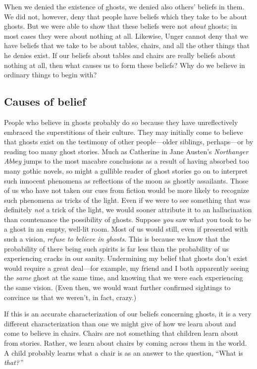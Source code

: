 \documentclass[11pt]{standalone} \newif\ifstandlone \standalonetrue
\begin{document}
\begin{spacing}{1.5}
When we denied the existence of ghosts, we denied also others' beliefs
in them.  We did not, however, deny that people have beliefs which
they take to be about ghosts.  But we were able to show that these
beliefs were not {\em about} ghosts; in most cases they were about
nothing at all.  Likewise, Unger cannot deny that we have beliefs that
we take to be about tables, chairs, and all the other things that he
denies exist.  If our beliefs about tables and chairs are really
beliefs about nothing at all, then what causes us to form these
beliefs?  Why do we believe in ordinary things to begin with?

\subsection{Causes of belief}
\label{unger-cause}
People who believe in ghosts probably do so because they have
unreflectively embraced the superstitions of their culture.  They may
initially come to believe that ghosts exist on the testimony of other
people---older siblings, perhaps---or by reading too many ghost
stories.  Much as Catherine in Jane Austen's {\em Northanger Abbey}
jumps to the most macabre conclusions as a result of having absorbed
too many gothic novels, so might a gullible reader of ghost stories go
on to interpret such innocent phenomena as reflections of the moon as
ghostly assailants.  Those of us who have not taken our cues from
fiction would be more likely to recognize such phenomena as tricks of
the light.  Even if we were to see something that was definitely {\em
  not} a trick of the light, we would sooner attribute it to an
hallucination than countenance the possibility of ghosts.  Suppose
{\em you} saw what you took to be a ghost in an empty, well-lit room.
Most of us would still, even if presented with such a vision, {\em
  refuse to believe in ghosts}.  This is because we know that the
probability of there being such spirits is far less than the
probability of us experiencing cracks in our sanity.  Undermining my
belief that ghosts don't exist would require a great deal---for
example, my friend and I both apparently seeing the {\em same} ghost
at the same time, and knowing that we were each experiencing the same
vision.  (Even then, we would want further confirmed sightings to
convince us that we weren't, in fact, crazy.)

If this is an accurate characterization of our beliefs concerning
ghosts, it is a very different characterization than one we might give
of how we learn about and come to believe in chairs.  Chairs are not
something that children learn about from stories.  Rather, we learn
about chairs by coming across them in the world.  A child probably
learns what a chair is as an answer to the question, ``What is {\em
  that?}\,''


\end{spacing}
\end{document}
